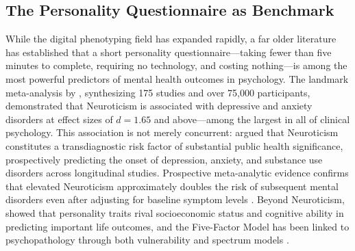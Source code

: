 \documentclass[12pt, a4paper]{article}
\begin{document}
\subsection{The Personality Questionnaire as Benchmark}

While the digital phenotyping field has expanded rapidly, a far older literature has established that a short personality questionnaire---taking fewer than five minutes to complete, requiring no technology, and costing nothing---is among the most powerful predictors of mental health outcomes in psychology. The landmark meta-analysis by \citet{kotov2010linking}, synthesizing 175 studies and over 75,000 participants, demonstrated that Neuroticism is associated with depressive and anxiety disorders at effect sizes of $d = 1.65$ and above---among the largest in all of clinical psychology. This association is not merely concurrent: \citet{lahey2009public} argued that Neuroticism constitutes a transdiagnostic risk factor of substantial public health significance, prospectively predicting the onset of depression, anxiety, and substance use disorders across longitudinal studies. Prospective meta-analytic evidence confirms that elevated Neuroticism approximately doubles the risk of subsequent mental disorders even after adjusting for baseline symptom levels \citep{dewall2011agree}. Beyond Neuroticism, \citet{roberts2007power} showed that personality traits rival socioeconomic status and cognitive ability in predicting important life outcomes, and the Five-Factor Model has been linked to psychopathology through both vulnerability and spectrum models \citep{widiger2007plate, mccrae1992introduction}.
\end{document}
